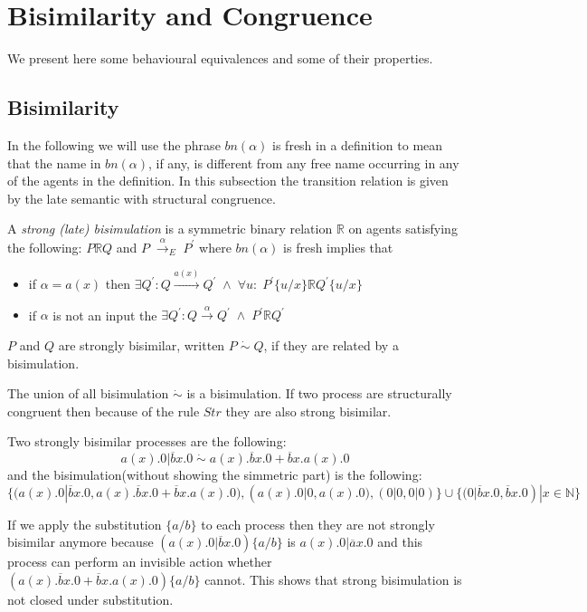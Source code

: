 \section{Bisimilarity and Congruence}

We present here some behavioural equivalences and some of their properties. 

\subsection{Bisimilarity}
In the following we will use the phrase $bn(\alpha)$ is fresh in a definition to mean that the name in $bn(\alpha)$, if any, is different from any free name occurring in any of the agents in the definition. In this subsection the transition relation is given by the late semantic with structural congruence.

\begin{definition}
  A \emph{strong (late) bisimulation} is a symmetric binary relation $\mathbb{R}$ on agents satisfying the following: $P\mathbb{R} Q$ and $P\; \xrightarrow{\alpha}_{E}\; P^{'}$ where $bn(\alpha)$ is fresh implies that
  \begin{itemize}
    \item
      if $\alpha=a(x)$ then $\exists Q^{'}: Q\xrightarrow{a(x)}Q^{'}\; \wedge\; \forall u:\; P^{'}\{u/x\}\mathbb{R}Q^{'}\{u/x\}$
    \item
      if $\alpha$ is not an input the $\exists Q^{'}: Q\xrightarrow{\alpha}Q^{'}\; \wedge\; P^{'}\mathbb{R}Q^{'}$
  \end{itemize}
  $P$ and $Q$ are strongly bisimilar, written $P\; \dot{\sim}\; Q$, if they are related by a bisimulation. 
\end{definition}

The union of all bisimulation $\dot{\sim}$ is a bisimulation. If two process are structurally congruent then because of the rule $Str$ they are also strong bisimilar.

\begin{example}
  Two strongly bisimilar processes are the following:
  \[
    a(x).0|\overline{b}x.0\; \dot{\sim}\; a(x).\overline{b}x.0 + \overline{b}x.a(x).0
  \]
  and the bisimulation(without showing the simmetric part) is  the following:
  \[
    \{(a(x).0|\overline{b}x.0, a(x).\overline{b}x.0 + \overline{b}x.a(x).0),(a(x).0|0,a(x).0), (0|0,0|0)\} \cup \{(0|\overline{b}x.0,\overline{b}x.0)|x\in \mathbb{N}\} 
  \]

  If we apply the substitution $\{a/b\}$ to each process then they are not strongly bisimilar anymore because $(a(x).0|\overline{b}x.0)\{a/b\}$ is $a(x).0|\overline{a}x.0$ and this process can perform an invisible action whether $(a(x).\overline{b}x.0 + \overline{b}x.a(x).0)\{a/b\}$ cannot. This shows that strong bisimulation is not closed under substitution.
\end{example}

